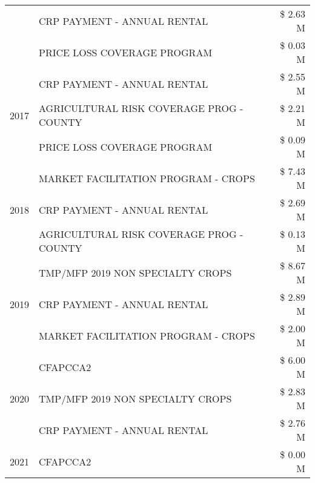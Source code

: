 \begin{tabular}{llr}
 & CRP PAYMENT - ANNUAL RENTAL                   & \$ 2.63 M \\
 & PRICE LOSS COVERAGE PROGRAM                   & \$ 0.03 M \\
\cline{1-3}
\multirow[t]{3}{*}{2017} & CRP PAYMENT - ANNUAL RENTAL & \$ 2.55 M \\
 & AGRICULTURAL RISK COVERAGE PROG - COUNTY & \$ 2.21 M \\
 & PRICE LOSS COVERAGE PROGRAM & \$ 0.09 M \\
\cline{1-3}
\multirow[t]{3}{*}{2018} & MARKET FACILITATION PROGRAM - CROPS & \$ 7.43 M \\
 & CRP PAYMENT - ANNUAL RENTAL & \$ 2.69 M \\
 & AGRICULTURAL RISK COVERAGE PROG - COUNTY & \$ 0.13 M \\
\cline{1-3}
\multirow[t]{3}{*}{2019} & TMP/MFP 2019 NON SPECIALTY CROPS & \$ 8.67 M \\
 & CRP PAYMENT - ANNUAL RENTAL & \$ 2.89 M \\
 & MARKET FACILITATION PROGRAM - CROPS & \$ 2.00 M \\
\cline{1-3}
\multirow[t]{3}{*}{2020} & CFAPCCA2 & \$ 6.00 M \\
 & TMP/MFP 2019 NON SPECIALTY CROPS & \$ 2.83 M \\
 & CRP PAYMENT - ANNUAL RENTAL & \$ 2.76 M \\
\cline{1-3}
2021 & CFAPCCA2 & \$ 0.00 M \\
\cline{1-3}
\bottomrule
\end{tabular}
